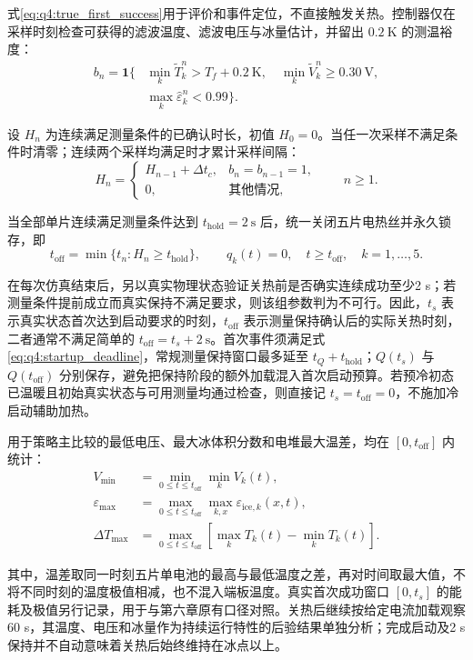 式\eqref{eq:q4:true_first_success}用于评价和事件定位，不直接触发关热。控制器仅在采样时刻检查可获得的滤波温度、滤波电压与冰量估计，并留出 $0.2\ \mathrm K$ 的测温裕度：
\begin{equation}
\begin{aligned}
b_n=\boldsymbol 1\big\{&
\min_k\widetilde T_k^n>T_f+0.2\ \mathrm K,
\quad\min_k\widetilde V_k^n\geq0.30\ \mathrm V,
\\
&\max_k\widehat\varepsilon_k^n<0.99\big\}.
\end{aligned}
\tag{7-32}\label{eq:q4:sensor_condition}
\end{equation}

设 $H_n$ 为连续满足测量条件的已确认时长，初值 $H_0=0$。当任一次采样不满足条件时清零；连续两个采样均满足时才累计采样间隔：
\begin{equation}
H_n=\begin{cases}
H_{n-1}+\Delta t_c, & b_n=b_{n-1}=1,\\
0, & \text{其他情况},
\end{cases}
\qquad n\geq1.
\tag{7-33}\label{eq:q4:hold_counter}
\end{equation}

当全部单片连续满足测量条件达到 $t_{\mathrm{hold}}=2\ \mathrm s$ 后，统一关闭五片电热丝并永久锁存，即
\begin{equation}
t_{\mathrm{off}}=\min\{t_n:H_n\geq t_{\mathrm{hold}}\},
\qquad q_k(t)=0,\quad t\geq t_{\mathrm{off}},\quad k=1,\ldots,5.
\tag{7-34}\label{eq:q4:shutdown_latch}
\end{equation}

在每次仿真结束后，另以真实物理状态验证关热前是否确实连续成功至少2 s；若测量条件提前成立而真实保持不满足要求，则该组参数判为不可行。因此，$t_s$ 表示真实状态首次达到启动要求的时刻，$t_{\mathrm{off}}$ 表示测量保持确认后的实际关热时刻，二者通常不满足简单的 $t_{\mathrm{off}}=t_s+2\ \mathrm s$。首次事件须满足式\eqref{eq:q4:startup_deadline}，常规测量保持窗口最多延至 $t_Q+t_{\mathrm{hold}}$；$Q(t_s)$ 与 $Q(t_{\mathrm{off}})$ 分别保存，避免把保持阶段的额外加载混入首次启动预算。若预冷初态已温暖且初始真实状态与可用测量均通过检查，则直接记 $t_s=t_{\mathrm{off}}=0$，不施加冷启动辅助加热。

用于策略主比较的最低电压、最大冰体积分数和电堆最大温差，均在 $[0,t_{\mathrm{off}}]$ 内统计：
\begin{equation}
\begin{aligned}
V_{\min}&=\min_{0\leq t\leq t_{\mathrm{off}}}\min_kV_k(t),\\
\varepsilon_{\max}&=\max_{0\leq t\leq t_{\mathrm{off}}}\max_{k,x}\varepsilon_{\mathrm{ice},k}(x,t),\\
\Delta T_{\max}&=\max_{0\leq t\leq t_{\mathrm{off}}}
\left[\max_kT_k(t)-\min_kT_k(t)\right].
\end{aligned}
\tag{7-35}\label{eq:q4:comparison_metrics}
\end{equation}

其中，温差取同一时刻五片单电池的最高与最低温度之差，再对时间取最大值，不将不同时刻的温度极值相减，也不混入端板温度。真实首次成功窗口 $[0,t_s]$ 的能耗及极值另行记录，用于与第六章原有口径对照。关热后继续按给定电流加载观察60 s，其温度、电压和冰量作为持续运行特性的后验结果单独分析；完成启动及2 s保持并不自动意味着关热后始终维持在冰点以上。
